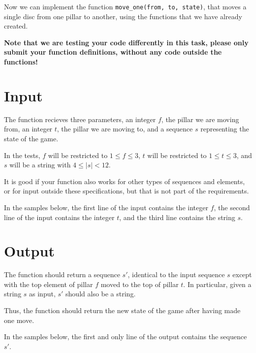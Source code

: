 
Now we can implement the function \texttt{move\_one(from, to, state)},
that moves a single disc from one pillar to another,
using the functions that we have already created.

\textbf{Note that we are testing your code differently in this task,
please only submit your function definitions, without any code outside the functions!}

\section*{Input}
The function recieves three parameters,
an integer $f$, the pillar we are moving from,
an integer $t$, the pillar we are moving to,
and a sequence $s$ representing the state of the game.

In the tests, $f$ will be restricted to $1 \le f \le 3$,
$t$ will be restricted to $1 \le t \le 3$,
and $s$ will be a string with $4 \le |s| < 12$.

It is good if your function also works for other types of sequences and elements,
or for input outside these specifications,
but that is not part of the requirements.

In the samples below,
the first line of the input contains the integer $f$,
the second line of the input contains the integer $t$,
and the third line contains the string $s$.

\section*{Output}

The function should return a sequence $s'$,
identical to the input sequence $s$
except with the top element of pillar $f$ 
moved to the top of pillar $t$.
In particular, given a string $s$ as input, $s'$ should also be a string.

Thus, the function should return the new state of the game
after having made one move.

In the samples below,
the first and only line of the output contains the sequence $s'$.
